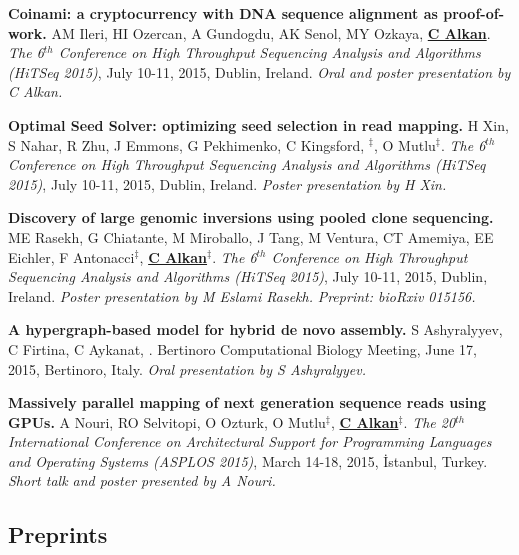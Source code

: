 \vspace{-.2cm}
 {\bf Coinami: a cryptocurrency with DNA sequence alignment as proof-of-work.}
  AM Ileri, HI Ozercan, A Gundogdu, AK Senol, MY Ozkaya, {\bf {\underline{C Alkan}}}.
{\em The 6$^{th}$ Conference on High Throughput Sequencing Analysis and Algorithms (HiTSeq 2015)}, 
July 10-11, 2015, Dublin, Ireland. {\it Oral and poster presentation by C Alkan.}



\vspace{-.2cm}        
       {\bf Optimal Seed Solver: optimizing seed selection in read mapping.}
       H Xin, S Nahar, R Zhu, J Emmons, G Pekhimenko, C Kingsford, \calkan{}$^\ddag$, O Mutlu$^\ddag$.
{\em The 6$^{th}$ Conference on High Throughput Sequencing Analysis and Algorithms (HiTSeq 2015)}, 
July 10-11, 2015, Dublin, Ireland. {\it Poster presentation by H Xin.}



\vspace{-.2cm}
{\bf Discovery of large genomic inversions using pooled clone sequencing.}
ME Rasekh, G Chiatante, M Miroballo, J Tang, M Ventura, CT Amemiya, EE Eichler, F Antonacci$^\ddag$, {\bf {\underline{C Alkan}}}$^\ddag$.
{\em The 6$^{th}$ Conference on High Throughput Sequencing Analysis and Algorithms (HiTSeq 2015)}, 
July 10-11, 2015, Dublin, Ireland. {\it Poster presentation by M Eslami Rasekh.} \textit{Preprint: bioRxiv 015156.}

\vspace{-.2cm}
  {\bf  A hypergraph-based model for hybrid de novo assembly.}
  S Ashyralyyev, C Firtina, C Aykanat, \calkan{}.
  Bertinoro Computational Biology Meeting, June 17, 2015, Bertinoro, Italy. {\it Oral presentation by S Ashyralyyev.}


\vspace{-.2cm}
 {\bf Massively parallel mapping of next generation sequence reads using GPUs.}
  A Nouri, RO Selvitopi, O Ozturk, O Mutlu$^\ddag$, {\bf {\underline{C Alkan}}}$^\ddag$.
{\em The 20$^{th}$ International Conference on Architectural Support for Programming Languages and Operating Systems (ASPLOS 2015)}, 
March 14-18, 2015, İstanbul, Turkey. {\it Short talk and poster presented by A Nouri.}



\vspace{-.4cm}
\subsection{\small \sc  Preprints}
 \vspace{-0.6cm}

